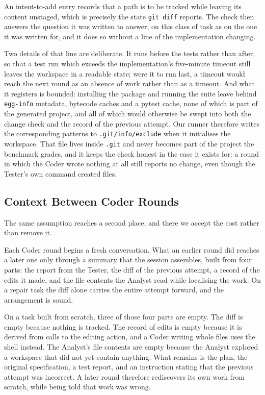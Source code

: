 An intent-to-add entry records that a path is to be tracked while leaving its
content unstaged, which is precisely the state \texttt{git diff} reports. The
check then answers the question it was written to answer, on this class of task
as on the one it was written for, and it does so without a line of the
implementation changing.

Two details of that line are deliberate. It runs before the tests rather than
after, so that a test run which exceeds the implementation's five-minute
timeout still leaves the workspace in a readable state; were it to run last, a
timeout would reach the next round as an absence of work rather than as a
timeout. And what it registers is bounded: installing the package and running
the suite leave behind \texttt{egg-info} metadata, bytecode caches and a pytest
cache, none of which is part of the generated project, and all of which would
otherwise be swept into both the change check and the record of the previous
attempt. Our runner therefore writes the corresponding patterns to
\texttt{.git/info/exclude} when it initialises the workspace. That file lives
inside \texttt{.git} and never becomes part of the project the benchmark
grades, and it keeps the check honest in the case it exists for: a round in
which the Coder wrote nothing at all still reports no change, even though the
Tester's own command created files.

\subsection{Context Between Coder Rounds}

The same assumption reaches a second place, and there we accept the cost rather
than remove it.

Each Coder round begins a fresh conversation. What an earlier round did reaches
a later one only through a summary that the session assembles, built from four
parts: the report from the Tester, the diff of the previous attempt, a record
of the edits it made, and the file contents the Analyst read while localising
the work. On a repair task the diff alone carries the entire attempt forward,
and the arrangement is sound.

On a task built from scratch, three of those four parts are empty. The diff is
empty because nothing is tracked. The record of edits is empty because it is
derived from calls to the editing action, and a Coder writing whole files uses
the shell instead. The Analyst's file contents are empty because the Analyst
explored a workspace that did not yet contain anything. What remains is the
plan, the original specification, a test report, and an instruction stating
that the previous attempt was incorrect. A later round therefore rediscovers
its own work from scratch, while being told that work was wrong.

